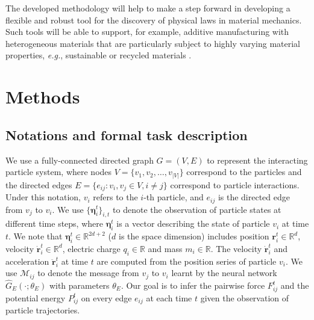 \documentclass{article}
\newcommand{\pignpi}{PIG'N'PI\xspace}
\newcommand{\eg}{\textit{e.g.}}
\begin{document}


The developed methodology will help to make a step forward in developing a flexible and robust tool for the discovery of physical laws in material mechanics. Such tools will be able to support, for example, additive manufacturing with heterogeneous materials that are particularly subject to highly varying material properties, \eg, sustainable or recycled materials \cite{wang2021inverse}. 
 



\section{Methods}
\label{sec:method}

\subsection{Notations and formal task description}
\label{sec:notation_task_description}
We use a fully-connected directed graph $G=(V, E)$ to represent the interacting particle system, where nodes $V = \{v_1, v_2, \ldots, v_{|V|}\}$  correspond to the particles and the directed edges $E = \{e_{ij}: v_i, v_j \in V, i\neq j\}$ correspond to particle interactions. Under this notation, $v_i$ refers to the $i$-th particle, and $e_{ij}$ is the directed edge from $v_j$ to $v_i$. We use $\{\bm{\eta}^t_i\}_{i, t}$ to denote the observation of particle states at different time steps, where $\bm{\eta}^t_i$ is a vector describing the state of particle $v_i$ at time $t$. We note that $\bm{\eta}^t_i \in \mathbb{R}^{2d+2}$ ($d$ is the space dimension) includes {position} $\bm{r}^t_i \in \mathbb{R}^d$, {velocity} $\bm{\dot{r}}^t_i \in \mathbb{R}^d$, {electric charge} $q_i \in \mathbb{R}$ and {mass} $m_i \in \mathbb{R}$. The {velocity} $\bm{\dot{r}}^t_i$ and {acceleration} $\bm{\ddot{r}}_i^t$ at time $t$ are computed from the position series of particle $v_i$. We use $\mathcal{M}_{ij}$ to denote the message from $v_j$ to $v_i$ learnt by the neural network $\hat{G}_E(\cdot; \theta_{E})$ with parameters $\theta_{E}$. 
Our goal is to infer the pairwise force $F_{ij}^t$ and the potential energy $P_{ij}^t$ on every edge $e_{ij}$ at each time $t$ given the observation of particle trajectories. 
\end{document}
